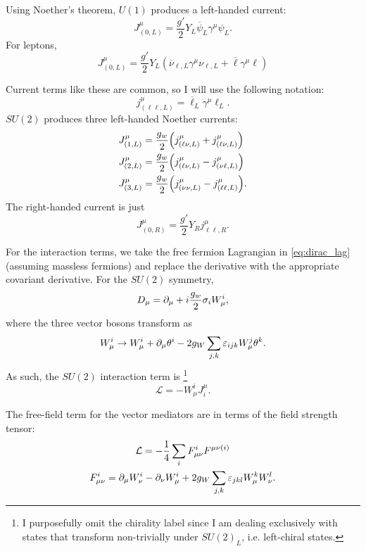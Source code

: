 Using Noether's theorem, $U(1)$ produces a left-handed current:
\begin{equation}
    J^{\mu}_{(0,L)} = \frac{g'}{2}Y_L\overline{\psi}_L\gamma^\mu\psi_L.
\end{equation}
For leptons,
\begin{equation}
    J^{\mu}_{(0,L)} = \frac{g'}{2}Y_L(\overline{\nu}_{\ell,L}\gamma^{\mu}\nu_{\ell,L}+\overline{\ell}\gamma^{\mu} \ell)
\end{equation}

Current terms like these are common, so I will use the following notation:
\begin{equation}
    j^{\mu}_{(\ell\ell,L)} = \overline{\ell}_L\gamma^\mu \ell_L.
\end{equation}
$SU(2)$ produces three left-handed Noether currents:
\begin{align}
    J^{\mu}_{(1,L)} &= \frac{g_w}{2}\qty(j^{\mu}_{(\ell\nu,L)}+j^{\mu}_{(\ell\nu,L)})\\
    J^{\mu}_{(2,L)} &= \frac{g_w}{2}\qty(j^{\mu}_{(\ell\nu,L)}-j^{\mu}_{(\nu \ell,L)}) \\
    J^{\mu}_{(3,L)} &= \frac{g_w}{2}\qty(j^{\mu}_{(\nu\nu,L)}-j^{\mu}_{(\ell\ell,L)}).
\end{align}
The right-handed current is just 
\begin{equation}
    J_{(0,R)}^{\mu}=\frac{g'}{2}Y_Rj^{\mu}_{\ell\ell,R}.
\end{equation}

For the interaction terms, we take the free fermion Lagrangian in \eqref{eq:dirac_lag} (assuming massless fermions) and replace the derivative with the appropriate covariant derivative. For the $SU(2)$ symmetry,
\begin{equation}
    D_\mu = \dcov + i\frac{g_w}{2} \sigma_i W_\mu^{i},
\end{equation}
where the three vector bosons transform as
\begin{equation}
    W_{\mu}^{i} \rightarrow W_{\mu}^{i}+\dcov \theta^{i} - 2g_W \sum_{j,k} \varepsilon_{ijk} W_{\mu}^{j}\theta^{k}.
\end{equation}
As such, the $SU(2)$ interaction term is \footnote{I purposefully omit the chirality label since I am dealing exclusively with states that transform non-trivially under $SU(2)_L$, i.e. left-chiral states.}
\begin{equation}
    \mathcal{L} = -W_{\mu}^{i} J_{i}^{\mu}.
\end{equation}

The free-field term for the vector mediators are in terms of the field strength tensor:
\begin{gather}
    \mathcal{L} = -\frac{1}{4} \sum_{i} F_{\mu\nu}^{i} F^{\mu\nu(i)}\\
    F_{\mu\nu}^{i} = \dcov W_{\nu}^{i} - \dcov[\nu] W_{\mu}^{i}+2g_W\sum_{j,k} \varepsilon_{jkl} W_{\mu}^{k}W_{\nu}^{l}.
\end{gather}

